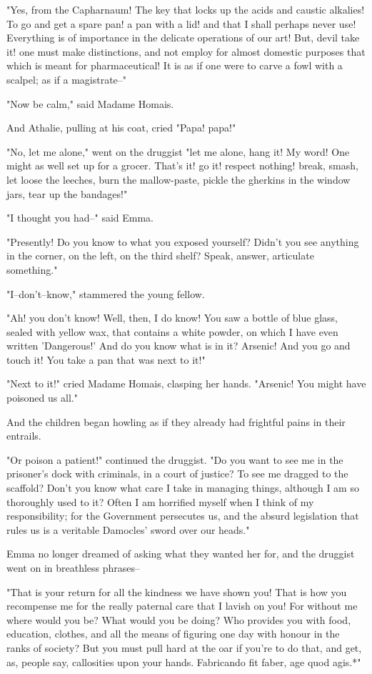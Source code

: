 \documentclass{tufte-book}
\begin{document}
"Yes, from the Capharnaum! The key that locks up the acids and caustic
alkalies! To go and get a spare pan! a pan with a lid! and that I
shall perhaps never use! Everything is of importance in the delicate
operations of our art! But, devil take it! one must make distinctions,
and not employ for almost domestic purposes that which is meant for
pharmaceutical! It is as if one were to carve a fowl with a scalpel; as
if a magistrate--"

"Now be calm," said Madame Homais.

And Athalie, pulling at his coat, cried "Papa! papa!"

"No, let me alone," went on the druggist "let me alone, hang it! My
word! One might as well set up for a grocer. That's it! go it! respect
nothing! break, smash, let loose the leeches, burn the mallow-paste,
pickle the gherkins in the window jars, tear up the bandages!"

"I thought you had--" said Emma.

"Presently! Do you know to what you exposed yourself? Didn't you see
anything in the corner, on the left, on the third shelf? Speak, answer,
articulate something."

"I--don't--know," stammered the young fellow.

"Ah! you don't know! Well, then, I do know! You saw a bottle of blue
glass, sealed with yellow wax, that contains a white powder, on which I
have even written 'Dangerous!' And do you know what is in it? Arsenic!
And you go and touch it! You take a pan that was next to it!"

"Next to it!" cried Madame Homais, clasping her hands. "Arsenic! You
might have poisoned us all."

And the children began howling as if they already had frightful pains in
their entrails.

"Or poison a patient!" continued the druggist. "Do you want to see me
in the prisoner's dock with criminals, in a court of justice? To see
me dragged to the scaffold? Don't you know what care I take in managing
things, although I am so thoroughly used to it? Often I am horrified
myself when I think of my responsibility; for the Government persecutes
us, and the absurd legislation that rules us is a veritable Damocles'
sword over our heads."

Emma no longer dreamed of asking what they wanted her for, and the
druggist went on in breathless phrases--

"That is your return for all the kindness we have shown you! That is how
you recompense me for the really paternal care that I lavish on you! For
without me where would you be? What would you be doing? Who provides
you with food, education, clothes, and all the means of figuring one day
with honour in the ranks of society? But you must pull hard at the oar
if you're to do that, and get, as, people say, callosities upon your
hands. Fabricando fit faber, age quod agis.*"
\end{document}
